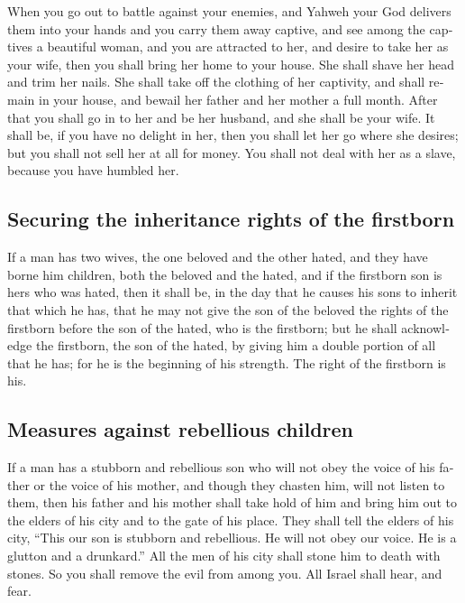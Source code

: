 \begin{paracol}{2}
\begin{otherlanguage}{english}
 When you go out to battle against your enemies, and
Yahweh your God delivers them into your hands and you carry them away
captive,  and see among the captives a beautiful woman,
and you are attracted to her, and desire to take her as your wife,
 then you shall bring her home to your house. She shall
shave her head and trim her nails.  She shall take off
the clothing of her captivity, and shall remain in your house, and
bewail her father and her mother a full month. After that you shall go
in to her and be her husband, and she shall be your wife.
 It shall be, if you have no delight in her, then you
shall let her go where she desires; but you shall not sell her at all
for money. You shall not deal with her as a slave, because you have
humbled her.

\hypertarget{securing-the-inheritance-rights-of-the-firstborn}{%
\subsection{Securing the inheritance rights of the
firstborn}\label{securing-the-inheritance-rights-of-the-firstborn}}

 If a man has two wives, the one beloved and the other
hated, and they have borne him children, both the beloved and the hated,
and if the firstborn son is hers who was hated,  then it
shall be, in the day that he causes his sons to inherit that which he
has, that he may not give the son of the beloved the rights of the
firstborn before the son of the hated, who is the firstborn;
 but he shall acknowledge the firstborn, the son of the
hated, by giving him a double portion of all that he has; for he is the
beginning of his strength. The right of the firstborn is his.

\hypertarget{measures-against-rebellious-children}{%
\subsection{Measures against rebellious
children}\label{measures-against-rebellious-children}}

 If a man has a stubborn and rebellious son who will not
obey the voice of his father or the voice of his mother, and though they
chasten him, will not listen to them,  then his father
and his mother shall take hold of him and bring him out to the elders of
his city and to the gate of his place.  They shall tell
the elders of his city, ``This our son is stubborn and rebellious. He
will not obey our voice. He is a glutton and a drunkard.''
 All the men of his city shall stone him to death with
stones. So you shall remove the evil from among you. All Israel shall
hear, and fear.


\end{otherlanguage}
\end{paracol}
